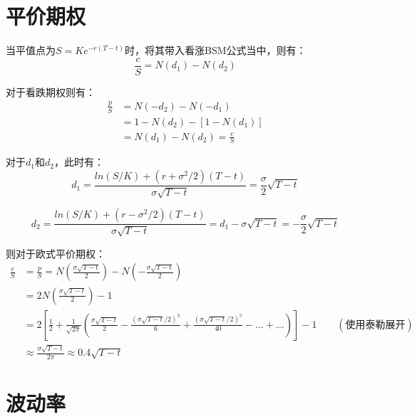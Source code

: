 \documentclass[11pt]{article}
\begin{document}
\section{平价期权}

当平值点为$S = K e^{-r(T-t)}$时，将其带入看涨BSM公式当中，则有：
\begin{equation}
    \frac{c}{S} = N(d_1) - N(d_2)
\end{equation}

对于看跌期权则有：
\begin{align*}
    \frac{p}{S} & = N(-d_2) - N(-d_1) \\
    & = 1 - N(d_2) - [1-N(d_1)] \\
    & = N(d_1) - N(d_2) = \frac{c}{S}
\end{align*}

对于$d_1$和$d_2$，此时有：
\begin{equation}
    d_1 = \frac{ln(S/K)+(r+\sigma^2/2)(T-t)}{\sigma\sqrt{T-t}} = \frac{\sigma}{2}\sqrt{T-t}
\end{equation}

\begin{equation}
    d_2 = \frac{ln(S/K)+(r-\sigma^2/2)(T-t)}{\sigma\sqrt{T-t}} = d_1 - \sigma\sqrt{T-t}= -\frac{\sigma}{2}\sqrt{T-t}
\end{equation}

则对于欧式平价期权：
\begin{align*}
    \frac{c}{S} & = \frac{p}{S} = N \left( \frac{\sigma\sqrt{T-t}}{2} \right) - N\left( -\frac{\sigma\sqrt{T-t}}{2} \right) \\
    & = 2N\left( \frac{\sigma\sqrt{T-t}}{2} \right) - 1 \\
    & = 2\left[\frac{1}{2} + \frac{1}{\sqrt{2\pi}} \left(\frac{\sigma\sqrt{T-t}}{2} - \frac{(\sigma\sqrt{T-t}/2)^3}{6} + \frac{(\sigma\sqrt{T-t}/2)^5}{40} - \dots + \dots\right) \right] - 1 \qquad (\text{使用泰勒展开}) \\
    & \approx \frac{\sigma\sqrt{T-t}}{2\pi} \approx 0.4\sqrt{T-t}
\end{align*}

\section{波动率}
\end{document}
